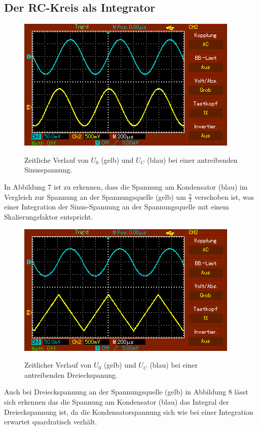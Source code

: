 	 \subsection{Der RC-Kreis als Integrator}
	 \begin{figure}[H]
	 	\centering
	 	\caption{Zeitliche Verlauf von $U_0$ (gelb) und $U_C$ (blau) bei einer antreibenden Sinusspannung.}
	 	\includegraphics[width=\linewidth-70pt,height=\textheight-70pt,keepaspectratio]{content/MAP002.png}
	 	\label{fig:Sinus}
	 \end{figure}
	 In Abbildung 7 ist zu erkennen, dass die Spannung am Kondensator (blau) im Vergleich zur Spannung an der Spannungsquelle (gelb) um $\frac{\pi}{2}$ verschoben ist, was einer Integration der Sinus-Spannung an der Spannungsquelle mit einem Skalierungsfaktor entspricht.


	 \begin{figure}[H]
	 	\centering
	 	\caption{Zeitlicher Verlauf von $U_0$ (gelb) und $U_C$ (blau) bei einer antreibenden Dreieckspanung.}
	 	\includegraphics[width=\linewidth-70pt,height=\textheight-70pt,keepaspectratio]{content/MAP003.png}
	 	\label{fig:Dreieck}
	 \end{figure}
	 Auch bei Dreieckspannung an der Spannungsquelle (gelb) in Abbildung 8 lässt sich erkennen das die Spannung am Kondensator (blau) das Integral der Dreieckspannung ist, da die Kondensatorspannung sich wie bei einer Integration erwartet quardratisch verhält.

